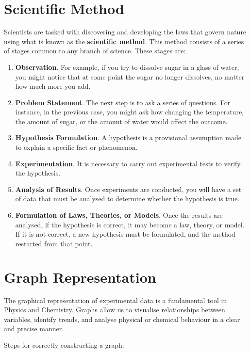 

\section{Scientific Method}
Scientists are tasked with discovering and developing the laws that govern nature using what is known as the \textbf{scientific method}.
This method consists of a series of stages common to any branch of science.
These stages are:
\begin{enumerate}[label=\numberballmDarkTeal]
        \item \textbf{Observation}.
        For example, if you try to dissolve sugar in a glass of water, you might notice that at some point the sugar no longer dissolves, no matter how much more you add.
        \item \textbf{Problem Statement}.
        The next step is to ask a series of questions.
        For instance, in the previous case, you might ask how changing the temperature, the amount of sugar, or the amount of water would affect the outcome.
        \item \textbf{Hypothesis Formulation}.
        A hypothesis is a provisional assumption made to explain a specific fact or phenomenon.
        \item \textbf{Experimentation}.
        It is necessary to carry out experimental tests to verify the hypothesis.
        \item \textbf{Analysis of Results}.
        Once experiments are conducted, you will have a set of data that must be analysed to determine whether the hypothesis is true.
        \item \textbf{Formulation of Laws, Theories, or Models}.
        Once the results are analysed, if the hypothesis is correct, it may become a law, theory, or model.
        If it is not correct, a new hypothesis must be formulated, and the method restarted from that point.
\end{enumerate}


\section{Graph Representation}
The graphical representation of experimental data is a fundamental tool in Physics and Chemistry.
Graphs allow us to visualise relationships between variables, identify trends, and analyse physical or chemical behaviour in a clear and precise manner.

Steps for correctly constructing a graph:

